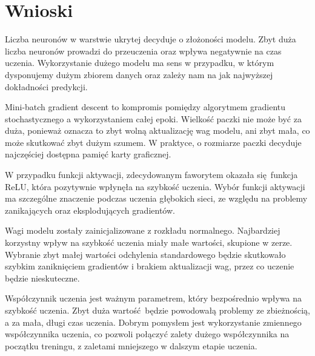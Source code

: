 \documentclass{article}
\begin{document}
\section{Wnioski}
Liczba neuronów w warstwie ukrytej decyduje o złożoności modelu.
Zbyt duża liczba neuronów prowadzi do przeuczenia oraz wpływa negatywnie na
czas uczenia.
Wykorzystanie dużego modelu ma sens w przypadku, w którym dysponujemy
dużym zbiorem danych oraz zależy nam na jak najwyższej dokładności predykcji.

Mini-batch gradient descent to kompromis pomiędzy algorytmem gradientu stochastycznego a wykorzystaniem całej epoki.
Wielkość paczki nie może być za duża, ponieważ oznacza to zbyt wolną aktualizację wag modelu, ani zbyt mała, co może skutkować zbyt dużym szumem.
W praktyce, o rozmiarze paczki decyduje najczęściej dostępna pamięć karty graficznej.

W przypadku funkcji aktywacji, zdecydowanym faworytem okazała się funkcja ReLU, 
która pozytywnie wpłynęła na szybkość uczenia.
Wybór funkcji aktywacji ma szczególne znaczenie podczas uczenia
głębokich sieci, ze względu na problemy zanikających oraz eksplodujących 
gradientów.

Wagi modelu zostały zainicjalizowane z rozkładu normalnego.
Najbardziej korzystny wpływ na szybkość uczenia miały małe wartości, skupione w zerze.
Wybranie zbyt małej wartości odchylenia standardowego będzie skutkowało szybkim zaniknięciem gradientów i brakiem aktualizacji wag, przez co uczenie będzie nieskuteczne.

Współczynnik uczenia jest ważnym parametrem, który bezpośrednio wpływa 
na szybkość uczenia.
Zbyt duża wartość będzie powodowałą problemy ze zbieżnością, a za mała, długi czas uczenia.
Dobrym pomysłem jest wykorzystanie zmiennego współczynnika uczenia, co pozwoli
połączyć zalety dużego współczynnika na początku treningu, z zaletami mniejszego
w dalszym etapie uczenia.
\end{document}
